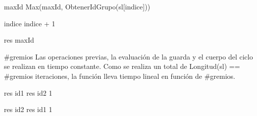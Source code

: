 {
	\state {} 									

	\state
	\state {} 								
							
		\state
		
		\state maxId \asig Max(maxId, ObtenerIdGrupo(sl[indice]))			

		\state
		\state indice \asig indice + 1								
	\endwhile
	\state

	\state res \asig maxId											
}
{ \#gremios }
{ Las operaciones previas, la evaluaci\'on de la guarda y el cuerpo del ciclo se realizan en tiempo constante. Como se realiza un total de Longitud(sl) == \#gremios iteraciones, la funci\'on lleva tiempo lineal en funci\'on de \#gremios. }

{
						
		\state res \asig id1			
	\Else
		\state res \asig id2			
	\endif
}
{1}
{}

{
						
		\state res \asig id2			
	\Else
		\state res \asig id1			
	\endif
}
{1}
{}